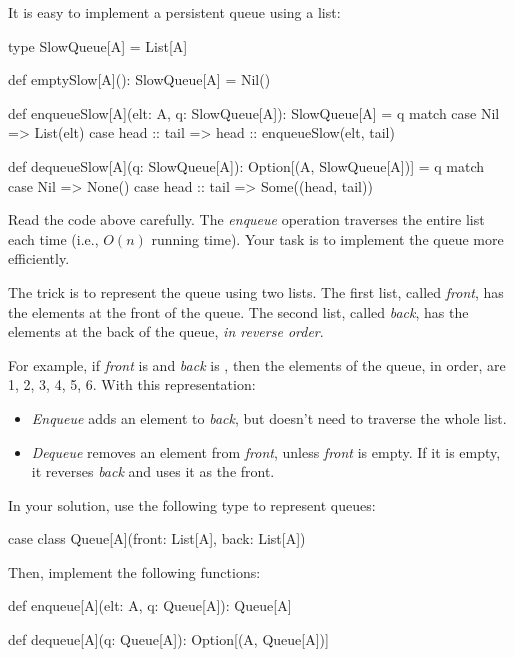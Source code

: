 It is easy to implement a persistent queue using a list:

\begin{scalacode}
type SlowQueue[A] = List[A]

def emptySlow[A](): SlowQueue[A] = Nil()

def enqueueSlow[A](elt: A, q: SlowQueue[A]): SlowQueue[A] = q match {
  case Nil => List(elt)
  case head :: tail => head :: enqueueSlow(elt, tail)
}

def dequeueSlow[A](q: SlowQueue[A]): Option[(A, SlowQueue[A])] = q match {
  case Nil => None()
  case head :: tail => Some((head, tail))
}
\end{scalacode}

Read the code above carefully. The \emph{enqueue} operation traverses the
entire list each time (i.e., $O(n)$ running time). Your task is to implement
the queue more efficiently.

The trick is to represent the queue using two lists. The first list, called
\emph{front}, has the elements at the front of the queue. The second list, called
\emph{back}, has the elements at the back of the queue, \emph{in reverse order}.

For example, if \emph{front} is  and \emph{back} is , then
the elements of the queue, in order, are 1, 2, 3, 4, 5, 6. With this
representation:

\begin{itemize}

\item \emph{Enqueue} adds an element to \emph{back}, but doesn't need to
  traverse the whole list.

\item \emph{Dequeue} removes an element from \emph{front}, unless \emph{front}
  is empty. If it is empty, it reverses \emph{back} and uses it as the front.

\end{itemize}

In your solution, use the following type to represent queues:

\begin{scalacode}
case class Queue[A](front: List[A], back: List[A])
\end{scalacode}

Then, implement the following functions:

\begin{scalacode}
def enqueue[A](elt: A, q: Queue[A]): Queue[A]

def dequeue[A](q: Queue[A]): Option[(A, Queue[A])]
\end{scalacode}

